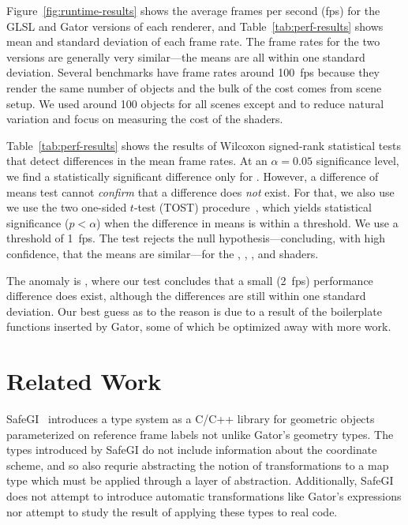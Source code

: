 {Figure~\ref{fig:runtime-results} shows the average frames per second (fps) for the GLSL and Gator versions of each renderer, and Table~\ref{tab:perf-results} shows mean and standard deviation of each frame rate.
The frame rates for the two versions are generally very similar---the means are all within one standard deviation.
Several benchmarks have frame rates around 100~fps because they render the same number of objects and the bulk of the cost comes from scene setup.
We used around 100 objects for all scenes except  and  to reduce natural variation and focus on measuring the cost of the shaders.

Table~\ref{tab:perf-results} shows the results of Wilcoxon signed-rank statistical tests that detect differences in the mean frame rates.
At an $\alpha = 0.05$ significance level, we find a statistically significant difference only for .
However, a difference of means test cannot \emph{confirm} that a difference does \emph{not} exist.
For that, we also use we use the two one-sided $t$-test (TOST) procedure~\cite{tost}, which yields statistical significance ($p < \alpha$) when the difference in means is within a threshold.
We use a threshold of 1~fps.
The test rejects the null hypothesis---concluding, with high confidence, that the means are similar---for the , , , and  shaders.

The anomaly is , where our test concludes that a small (2~fps) performance difference does exist, although the differences are still within one standard deviation.
Our best guess as to the reason is due to a result of the boilerplate functions inserted by Gator, some of which be optimized away with more work.

\section{Related Work}
\label{sec:rw}

SafeGI~\cite{safegi} introduces a type system as a C/C++ library for geometric objects parameterized on reference frame labels not unlike Gator's geometry types.  The types introduced by SafeGI do not include information about the coordinate scheme, and so also requrie abstracting the notion of transformations to a map type which must be applied through a layer of abstraction.  
Additionally, SafeGI does not attempt to introduce automatic transformations like Gator's  expressions nor attempt to study the result of applying these types to real code.

}
